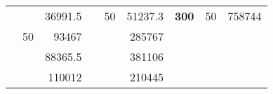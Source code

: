 \begin{table}[H]
\begin{tabular}{|ccrccrccc}
\rowcolor[HTML]{DDFDFF} 
\multicolumn{1}{|c|}{\cellcolor[HTML]{FFFFC7}}                                & \multicolumn{1}{c|}{\cellcolor[HTML]{DDFDFF}}                      & \multicolumn{1}{r|}{\cellcolor[HTML]{DAE8FC}36991.5}   & \multicolumn{1}{c|}{\cellcolor[HTML]{FFFFC7}}                                & \multicolumn{1}{c|}{\multirow{-10}{*}{\cellcolor[HTML]{DDFDFF}50}}  & \multicolumn{1}{r|}{\cellcolor[HTML]{DDFDFF}51237.3}   & \multicolumn{1}{c|}{\multirow{-19}{*}{\cellcolor[HTML]{FFFFC7}\textbf{300}}} & \multicolumn{1}{c|}{\multirow{-10}{*}{\cellcolor[HTML]{DDFDFF}50}} & \multicolumn{1}{r|}{\cellcolor[HTML]{DDFDFF}758744}    \\ \cline{3-3} \cline{5-9} 
\multicolumn{1}{|c|}{\cellcolor[HTML]{FFFFC7}}                                & \multicolumn{1}{c|}{\multirow{-10}{*}{\cellcolor[HTML]{DDFDFF}50}} & \multicolumn{1}{r|}{\cellcolor[HTML]{DDFDFF}93467}     & \multicolumn{1}{c|}{\cellcolor[HTML]{FFFFC7}}                                & \multicolumn{1}{c|}{\cellcolor[HTML]{DAE8FC}}                       & \multicolumn{1}{r|}{\cellcolor[HTML]{DAE8FC}285767}    &                                                                              &                                                                    &                                                        \\ \cline{2-3} \cline{6-6}
\multicolumn{1}{|c|}{\cellcolor[HTML]{FFFFC7}}                                & \multicolumn{1}{c|}{\cellcolor[HTML]{DAE8FC}}                      & \multicolumn{1}{r|}{\cellcolor[HTML]{DAE8FC}88365.5}   & \multicolumn{1}{c|}{\cellcolor[HTML]{FFFFC7}}                                & \multicolumn{1}{c|}{\cellcolor[HTML]{DAE8FC}}                       & \multicolumn{1}{r|}{\cellcolor[HTML]{DDFDFF}381106}    &                                                                              &                                                                    &                                                        \\ \cline{3-3} \cline{6-6}
\multicolumn{1}{|c|}{\cellcolor[HTML]{FFFFC7}}                                & \multicolumn{1}{c|}{\cellcolor[HTML]{DAE8FC}}                      & \multicolumn{1}{r|}{\cellcolor[HTML]{DDFDFF}110012}    & \multicolumn{1}{c|}{\cellcolor[HTML]{FFFFC7}}                                & \multicolumn{1}{c|}{\cellcolor[HTML]{DAE8FC}}                       & \multicolumn{1}{r|}{\cellcolor[HTML]{DAE8FC}210445}    &                                                                              &                                                                    &                                                        \\ \cline{3-3} \cline{6-6}

\end{tabular}
\end{table}
